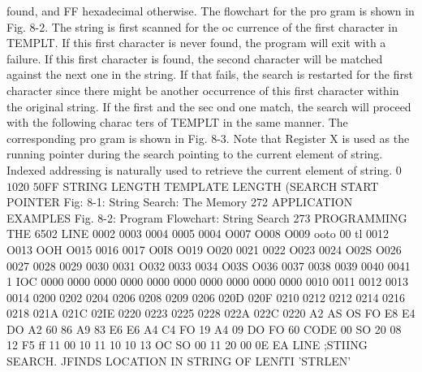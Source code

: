 found, and FF hexadecimal otherwise. The flowchart for the pro
gram is shown in Fig. 8-2. The string is first scanned for the oc
currence of the first character in TEMPLT. If this first character
is never found, the program will exit with a failure. If this first
character is found, the second character will be matched against
the next one in the string. If that fails, the search is restarted for
the first character since there might be another occurrence of this
first character within the original string. If the first and the sec
ond one match, the search will proceed with the following charac
ters of TEMPLT in the same manner. The corresponding pro
gram is shown in Fig. 8-3. Note that Register X is used as the
running pointer during the search pointing to the current element
of string. Indexed addressing is naturally used to retrieve the
current element of string.
0
$10
$20
$50
$FF
STRING LENGTH
TEMPLATE LENGTH
(SEARCH START POINTER
Fig: 8-1: String Search: The Memory
272
APPLICATION EXAMPLES
Fig. 8-2: Program Flowchart: String Search
273
PROGRAMMING THE 6502
LINE
0002
0003
0004
0005
0004
O007
O008
O009
ooto
00 tl
0012
O013
OOH
O015
0016
0017
O0I8
O019
O020
0021
0022
O023
0024
O02S
O026
0027
0028
0029
0030
0031
O032
0033
0034
O03S
O036
0037
0038
0039
0040
0041
1 IOC
0000
0000
0000
0000
0000
0000
0000
0000
0000
0000
0010
0011
0012
0013
0014
0200
0202
0204
0206
0208
0209
0206
020D
020F
0210
0212
0212
0214
0216
0218
021A
021C
02IE
0220
0223
0225
0228
022A
022C
0220
A2
AS
OS
FO
E8
E4
DO
A2
60
86
A9
83
E6
E6
A4
C4
FO
19
A4
09
DO
FO
60
CODE
00
SO
20
08
12
F5
ff
11
00
10
11
10
10
13
OC
SO 00
11
20 00
0E
EA
LINE
;STIING SEARCH.
JFINDS LOCATION IN STRING OF LENfTI 'STRLEN'
